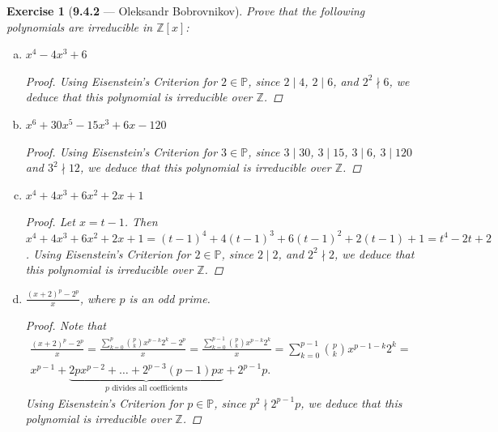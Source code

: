 \documentclass[12pt]{amsart}
\newtheorem{exercise}[theorem]{Exercise}
\theoremstyle{remark}
\newcommand{\ZZ}{{\mathbb Z}}
\theoremstyle{mycomment}
\begin{document}
  \begin{exercise}[\textbf{9.4.2} --- Oleksandr Bobrovnikov]
    Prove that the following polynomials are irreducible in $\ZZ[x]$:
    \begin{enumerate}[(a)]
      \item $x^4-4x^3+6$
      \begin{proof}
        Using Eisenstein's Criterion for $2\in\mathbb P$, since $2\mid 4$, $2\mid 6$, and $2^2\nmid 6$, we deduce that this polynomial is irreducible over $\ZZ$.
      \end{proof}
      \item $x^6 +30 x^5-15x^3+6x-120$
      \begin{proof}
        Using Eisenstein's Criterion for
         $3\in\mathbb P$,
         since $3\mid 30$, $3\mid 15$, $3\mid 6$, $3\mid 120$  and $3^2\nmid 12$,
         we deduce that this polynomial is irreducible over $\ZZ$.
      \end{proof}
      \item $x^4+4x^3+6x^2+2x+1$
      \begin{proof}
        Let $x=t-1$. Then $x^4+4x^3+6x^2+2x+1=(t-1)^4+4 (t-1)^3+6 (t-1)^2+2 (t-1)+1=t^4-2 t+2$.
        Using Eisenstein's Criterion for
         $2\in\mathbb P$,
         since $2\mid 2$,   and $2^2\nmid 2$,
         we deduce that this polynomial is irreducible over $\ZZ$.
      \end{proof}
      \item $\frac{(x+2)^p-2^p}{x}$, where $p$ is an odd prime.
      \begin{proof}
        Note that
        \begin{multline}
          \frac{(x+2)^p-2^p}{x}=\frac{\sum\limits_{k=0}^p {p\choose k} x^{p-k} 2^{k} -2^p}{x}=
          \frac{\sum\limits_{k=0}^{p-1} {p\choose k} x^{p-k} 2^{k}}{x}=
          \sum\limits_{k=0}^{p-1} {p\choose k} x^{p-1-k} 2^{k}=\\
          x^{p-1}+\underset{p\text{ divides all coefficients}}{\underbrace{2px^{p-2}+\dots+2^{p-3}(p-1)px}}+2^{p-1}p.
        \end{multline}
        Using Eisenstein's Criterion for
         $p\in\mathbb P$, since $p^2\nmid 2^{p-1}p$,
         we deduce that this polynomial is irreducible over $\ZZ$.
      \end{proof}
    \end{enumerate}
  \end{exercise}
  \vspace{.15in}
\end{document}
